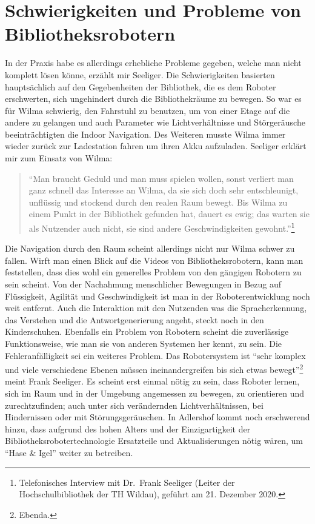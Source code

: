 \documentclass[a4paper,
fontsize=11pt,
oneside,
numbers=noperiodatend,
parskip=half-,
bibliography=totoc,
final
]{scrartcl}
\begin{document}
\hypertarget{schwierigkeiten-und-probleme-von-bibliotheksrobotern}{%
\section{Schwierigkeiten und Probleme von
Bibliotheksrobotern}\label{schwierigkeiten-und-probleme-von-bibliotheksrobotern}}

In der Praxis habe es allerdings erhebliche Probleme gegeben, welche man
nicht komplett lösen könne, erzählt mir Seeliger. Die Schwierigkeiten
basierten hauptsächlich auf den Gegebenheiten der Bibliothek, die es dem
Roboter erschwerten, sich ungehindert durch die Bibliothekräume zu
bewegen. So war es für Wilma schwierig, den Fahrstuhl zu benutzen, um
von einer Etage auf die andere zu gelangen und auch Parameter wie
Lichtverhältnisse und Störgeräusche beeinträchtigten die Indoor
Navigation. Des Weiteren musste Wilma immer wieder zurück zur
Ladestation fahren um ihren Akku aufzuladen. Seeliger erklärt mir zum
Einsatz von Wilma:

\begin{quote}
\enquote{Man braucht Geduld und man muss spielen wollen, sonst verliert
man ganz schnell das Interesse an Wilma, da sie sich doch sehr
entschleunigt, unflüssig und stockend durch den realen Raum bewegt. Bis
Wilma zu einem Punkt in der Bibliothek gefunden hat, dauert es ewig; das
warten sie als Nutzender auch nicht, sie sind andere Geschwindigkeiten
gewohnt.}\footnote{Telefonisches Interview mit Dr.~Frank Seeliger
  (Leiter der Hochschulbibliothek der TH Wildau), geführt am 21.
  Dezember 2020.}
\end{quote}

Die Navigation durch den Raum scheint allerdings nicht nur Wilma schwer
zu fallen. Wirft man einen Blick auf die Videos von Bibliotheksrobotern,
kann man feststellen, dass dies wohl ein generelles Problem von den
gängigen Robotern zu sein scheint. Von der Nachahmung menschlicher
Bewegungen in Bezug auf Flüssigkeit, Agilität und Geschwindigkeit ist
man in der Roboterentwicklung noch weit entfernt. Auch die Interaktion
mit den Nutzenden was die Spracherkennung, das Verstehen und die
Antwortgenerierung angeht, steckt noch in den Kinderschuhen. Ebenfalls
ein Problem von Robotern scheint die zuverlässige Funktionsweise, wie
man sie von anderen Systemen her kennt, zu sein. Die Fehleranfälligkeit
sei ein weiteres Problem. Das Robotersystem ist \enquote{sehr komplex
und viele verschiedene Ebenen müssen ineinandergreifen bis sich etwas
bewegt}\footnote{Ebenda.} meint Frank Seeliger. Es scheint erst einmal
nötig zu sein, dass Roboter lernen, sich im Raum und in der Umgebung
angemessen zu bewegen, zu orientieren und zurechtzufinden; auch unter
sich verändernden Lichtverhältnissen, bei Hindernissen oder mit
Störungsgeräuschen. In Adlershof kommt noch erschwerend hinzu, dass
aufgrund des hohen Alters und der Einzigartigkeit der
Bibliotheksrobotertechnologie Ersatzteile und Aktualisierungen nötig
wären, um \enquote{Hase \& Igel} weiter zu betreiben.
\end{document}
